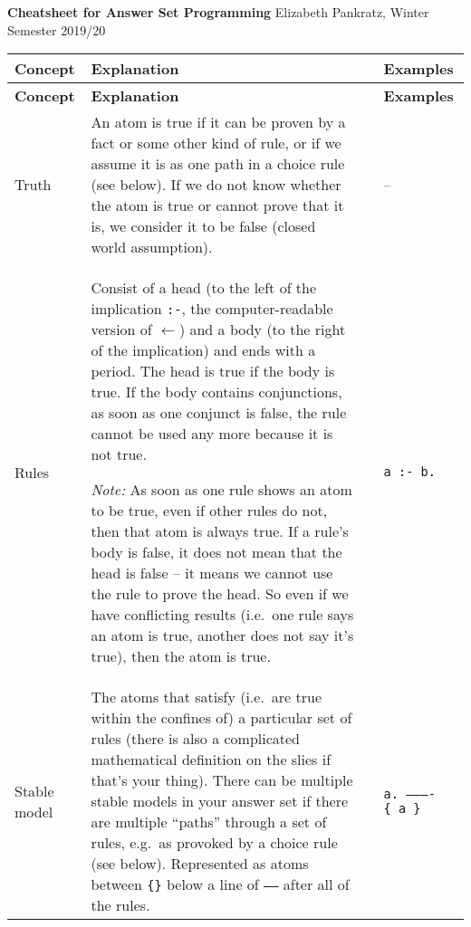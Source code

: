\documentclass[10pt,a4paper,landscape]{article}
\begin{document}
	
\noindent
\textbf{Cheatsheet for Answer Set Programming} \hfill Elizabeth Pankratz, Winter Semester 2019/20
	
\begin{longtable}{p{3cm}p{14cm}lp{3.5cm}p{3.5cm}}
	
\toprule
\textbf{Concept} & \textbf{Explanation} && \multicolumn{2}{l}{\textbf{Examples}}\\ \midrule
\endfirsthead

\toprule
\textbf{Concept} & \textbf{Explanation} && \multicolumn{2}{l}{\textbf{Examples}}\\ \midrule
\endhead

\hline
\endfoot

\bottomrule
\endlastfoot
	
	
	Truth
		& An atom is true if it can be proven by a fact or some other kind of rule, or if we assume it is as one path in a choice rule (see below).
		If we do not know whether the atom is true or cannot prove that it is, we consider it to be false (closed world assumption). 
		&& -- &\\ \midrule
	
	Rules
		& Consist of a head (to the left of the implication \texttt{:-}, the computer-readable version of $\leftarrow$) and a body (to the right of the implication) and ends with a period.
		The head is true if the body is true.
		If the body contains conjunctions, as soon as one conjunct is false, the rule cannot be used any more because it is not true.
		
		\emph{Note:} As soon as one rule shows an atom to be true, even if other rules do not, then that atom is always true. 
		If a rule's body is false, it does not mean that the head is false -- it means we cannot use the rule to prove the head.
		So even if we have conflicting results (i.e.\ one rule says an atom is true, another does not say it's true), then the atom is true.
		&& \texttt{a :- b.} &\\ \midrule
		
	Stable model
		& The atoms that satisfy (i.e.\ are true within the confines of) a particular set of rules (there is also a complicated mathematical definition on the slies if that's your thing).
		There can be multiple stable models in your answer set if there are multiple ``paths'' through a set of rules, e.g.\ as provoked by a choice rule (see below).
		Represented as atoms between \texttt{\{\}} below a line of \texttt{-----} after all of the rules.
		&& \texttt{a. \newline
				---------- \newline
				\{ a \}} &\\ \midrule
	

\end{longtable}
\end{document}
